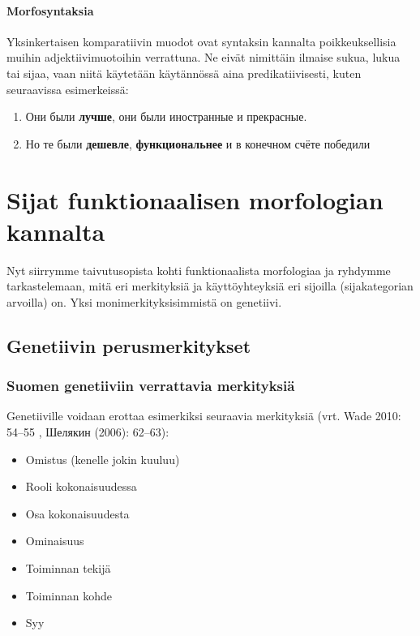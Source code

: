 \documentclass[]{scrreprt}
\providecommand{\tightlist}{%
  \setlength{\itemsep}{0pt}\setlength{\parskip}{0pt}}
\begin{document}
\subsubsection{Morfosyntaksia}\label{morfosyntaksia}

Yksinkertaisen komparatiivin muodot ovat syntaksin kannalta
poikkeuksellisia muihin adjektiivimuotoihin verrattuna. Ne eivät
nimittäin ilmaise sukua, lukua tai sijaa, vaan niitä käytetään
käytännössä aina predikatiivisesti, kuten seuraavissa esimerkeissä:

\begin{enumerate}
\def\labelenumi{(\arabic{enumi})}
\setcounter{enumi}{21}
\tightlist
\item
  Они были \textbf{лучше}, они были иностранные и прекрасные.
\item
  Но те были \textbf{дешевле}, \textbf{функциональнее} и в конечном
  счёте победили
\end{enumerate}

\chapter{Sijat funktionaalisen morfologian
kannalta}\label{luento-7-sijat-funktionaalisen-morfologian-kannalta}


Nyt siirrymme taivutusopista kohti funktionaalista morfologiaa ja
ryhdymme tarkastelemaan, mitä eri merkityksiä ja käyttöyhteyksiä eri
sijoilla (sijakategorian arvoilla) on. Yksi monimerkityksisimmistä on
genetiivi.

\section{Genetiivin
perusmerkitykset}\label{genetiivin-perusmerkitykset}

\subsection{Suomen genetiiviin verrattavia
merkityksiä}\label{suomen-genetiiviin-verrattavia-merkityksiuxe4}

Genetiiville voidaan erottaa esimerkiksi seuraavia merkityksiä (vrt.
Wade 2010: 54--55 , Шелякин (2006): 62--63):

\begin{itemize}
\tightlist
\item
  Omistus (kenelle jokin kuuluu)
\item
  Rooli kokonaisuudessa
\item
  Osa kokonaisuudesta
\item
  Ominaisuus
\item
  Toiminnan tekijä
\item
  Toiminnan kohde
\item
  Syy
\end{itemize}
\end{document}
